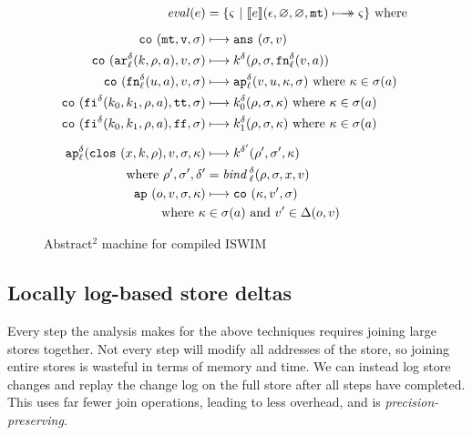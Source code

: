 \documentclass[preprint,onecolumn,9pt]{sigplanconf} %
\begin{document}
\begin{figure}
\begin{align*}
\mathit{eval}(\mexp) &= \{ \mstate\ |\ \compile{\mexp}(\epsilon,\varnothing,\varnothing,\kmt) \multimachstep \mstate \} \text{ where }
\\[2mm]
\co{\kmt,\mval,\msto} &\machstep
\ans{\msto,\mval}
\\
\co{\kar[^\mcntr_\mlab]{\mcomp,\menv,\maddr},\mval,\msto} & \machstep
\mcomp^\mcntr(\menv,\msto,\kfn[^\mcntr_\mlab]{\mval,\maddr})
\\
\co{\kfn[^\mcntr_\mlab]{{\mvalx{u}},\maddr},\mval,\msto} & \machstep
\ap[^\mcntr_\mlab]{\mval,\mvalx{u},\mkont,\msto}
\text{ where }\mkont \in \msto(\maddr)
\\
\co{\kif[^\mcntr]{\mcompi0,\mcompi1,\menv,\maddr},\strue,\msto} & \machstep
\mcompi0^\mcntr(\menv,\msto,\mkont)
\text{ where }\mkont\in\msto(\maddr)
\\
\co{\kif[^\mcntr]{\mcompi0,\mcompi1,\menv,\maddr},\sfalse,\msto} & \machstep
\mcompi1^\mcntr(\menv,\msto,\mkont)
\text{ where }\mkont\in\msto(\maddr)
\\[2mm]
\ap[^\mcntr_\mlab]{\clos{\mvar,\mcomp,\menv},\mval,\msto,\mkont} & \machstep
\mcomp^{\mcntr'}(\menv',\msto',\mkont) \\
\text{ where }\menv',\msto',\mcntr' &= \mathit{bind\,}^{ \mcntr}_\mlab(\menv,\msto,\mvar,\mval)
\\
\ap{\mop,\mval,\msto,\mkont} & \machstep
\co{\mkont,\mval',\msto} \\
\text{ where }\mkont &\in\msto(\maddr)
\text{ and } \mval'\in\interpdelta(\mop,\mval)
\end{align*}
\caption{Abstract$^2$ machine for compiled ISWIM}
\label{fig:caam}
\end{figure}




\subsection{Locally log-based store deltas}

Every step the analysis makes for the above techniques requires
joining large stores together. Not every step will modify all
addresses of the store, so joining entire stores is wasteful in terms
of memory and time. We can instead log store changes and replay the
change log on the full store after all steps have completed. This uses
far fewer join operations, leading to less overhead, and is \emph{precision-preserving}.
\end{document}
